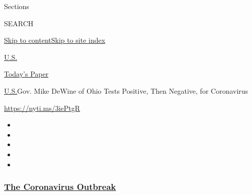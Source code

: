 Sections

SEARCH

\protect\hyperlink{site-content}{Skip to
content}\protect\hyperlink{site-index}{Skip to site index}

\href{https://www.nytimes3xbfgragh.onion/section/us}{U.S.}

\href{https://myaccount.nytimes3xbfgragh.onion/auth/login?response_type=cookie\&client_id=vi}{}

\href{https://www.nytimes3xbfgragh.onion/section/todayspaper}{Today's
Paper}

\href{/section/us}{U.S.}\textbar{}Gov. Mike DeWine of Ohio Tests
Positive, Then Negative, for Coronavirus

\url{https://nyti.ms/3iePtgR}

\begin{itemize}
\item
\item
\item
\item
\item
\end{itemize}

\hypertarget{the-coronavirus-outbreak}{%
\subsubsection{\texorpdfstring{\href{https://www.nytimes3xbfgragh.onion/news-event/coronavirus?name=styln-coronavirus-national\&region=TOP_BANNER\&block=storyline_menu_recirc\&action=click\&pgtype=Article\&impression_id=d1208d40-f4b9-11ea-b11b-3733e3cfd085\&variant=undefined}{The
Coronavirus
Outbreak}}{The Coronavirus Outbreak}}\label{the-coronavirus-outbreak}}

